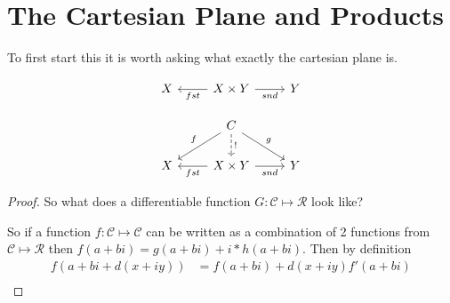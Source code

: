 \section{The Cartesian Plane and Products}

To first start this it is worth asking what exactly the cartesian plane is. 

\[\begin{tikzcd}
	X & {X \times Y} & Y
	\arrow["fst", from=1-2, to=1-1]
	\arrow["snd"', from=1-2, to=1-3]
\end{tikzcd}\]



\[\begin{tikzcd}
	& C \\
	X & {X \times Y} & Y
	\arrow["fst", from=2-2, to=2-1]
	\arrow["snd"', from=2-2, to=2-3]
	\arrow["f"', from=1-2, to=2-1]
	\arrow["g", from=1-2, to=2-3]
	\arrow["{!}", dashed, from=1-2, to=2-2]
\end{tikzcd}\]

\begin{theorem}
  
\end{theorem}
\begin{proof}
  So what does a differentiable function $G: \mathcal{C}\mapsto \mathcal{R}$ look like?

  So if a function $f:\mathcal{C}\mapsto \mathcal{C}$ can be written as a combination of 2 functions from $\mathcal{C}\mapsto \mathcal{R}$ then $f(a+bi)=g(a+bi)+i*h(a+bi)$. Then by definition 
  \begin{align*}
    f(a+bi+d(x+iy))&=f(a+bi)+d(x+iy)f'(a+bi)\\
  \end{align*}
\end{proof}

